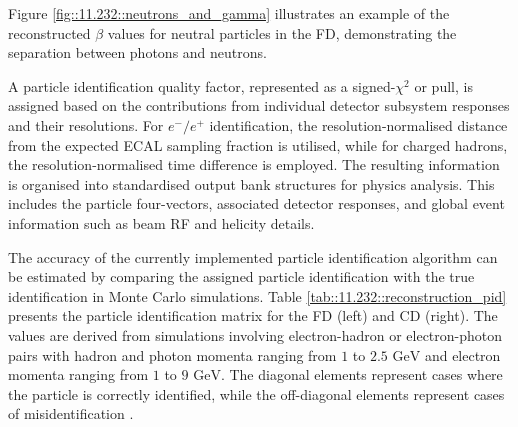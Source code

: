     Figure \ref{fig::11.232::neutrons_and_gamma} illustrates an example of the reconstructed $\beta$ values for neutral particles in the FD, demonstrating the separation between photons and neutrons.

    A particle identification quality factor, represented as a signed-$\chi^2$ or pull, is assigned based on the contributions from individual detector subsystem responses and their resolutions.
    For $e^-/e^+$ identification, the resolution-normalised distance from the expected ECAL sampling fraction is utilised, while for charged hadrons, the resolution-normalised time difference is employed.
    The resulting information is organised into standardised output bank structures for physics analysis.
    This includes the particle four-vectors, associated detector responses, and global event information such as beam RF and helicity details.

    The accuracy of the currently implemented particle identification algorithm can be estimated by comparing the assigned particle identification with the true identification in Monte Carlo simulations.
    Table \ref{tab::11.232::reconstruction_pid} presents the particle identification matrix for the FD (left) and CD (right).
    The values are derived from simulations involving electron-hadron or electron-photon pairs with hadron and photon momenta ranging from $1$ to $2.5 \text{ GeV}$ and electron momenta ranging from $1$ to $9 \text{ GeV}$.
    The diagonal elements represent cases where the particle is correctly identified, while the off-diagonal elements represent cases of misidentification \cite{ziegler2020}.

